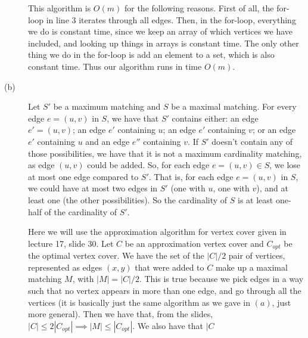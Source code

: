 \documentclass{article}
\begin{document}
\begin{description}
        This algorithm is $O(m)$ for the following reasons. First of all, the
        for-loop in line 3 iterates through all edges. Then, in
        the for-loop, everything we do is constant time, since we keep an array
        of which vertices we have included, and looking up things in arrays is
        constant time. The only other thing we do in the for-loop is add an
        element to a set, which is also constant time. Thus our algorithm runs
        in time $O(m)$.
    \item[(b)]
        Let $S'$ be a maximum matching and $S$ be a maximal matching.
        For every edge $e = (u,v)$ in $S$, we have that $S'$ contains either: an
        edge $e' = (u,v)$; an edge $e'$ containing $u$; an edge $e'$ containing
        $v$; or an edge $e'$ containing $u$ and an edge $e''$ containing $v$. If
        $S'$ doesn't contain any of those possibilities, we have that it is not
        a maximum cardinality matching, as edge $(u,v)$ could be added.
        So, for each edge $e = (u,v) \in S$,
        we lose at most one edge compared to $S'$. That is, for each edge
        $e = (u,v)$ in $S$, we could have at most two edges in $S'$ (one with
        $u$, one with $v$), and at
        least one (the other possibilities). So the cardinality of $S$ is at least
        one-half of the cardinality of $S'$.

        Here we will use the approximation algorithm for vertex cover given in
        lecture 17, slide 30. Let $C$ be an approximation vertex cover and
        $C_{opt}$ be the optimal vertex cover. We have
        the set of the $|C|/2$ pair of vertices, represented as edges $(x,y)$
        that were added to $C$ make up a maximal matching $M$, with $|M| =
        |C|/2$. This is true because we pick edges in a way such that no vertex
        appears in more than one edge, and go through all the vertices (it is
        basically just the same algorithm as we gave in $(a)$, just more
        general). Then we have that, from the slides, $|C| \leq 2|C_{opt}|
        \implies |M| \leq |C_{opt}|$. We also have that $|C$
\end{description}
\newpage

\end{document}
